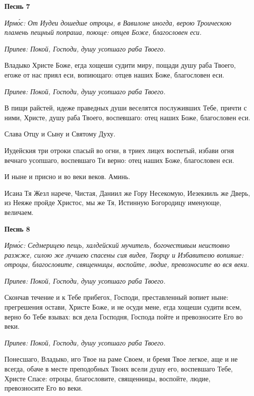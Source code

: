 \bfseries Песнь 7\normalfont{}


 \itshape Ирмо́с:\normalfont{} От Иудеи дошедше отроцы, в Вавилоне иногда, верою Троическою
пламень пещный попраша, поюще: отцев Боже, благословен еси.


 \itshape Припев:\normalfont{} Покой, Господи, душу усопшаго раба Твоего.


   Владыко Христе Боже, егда хощеши судити миру, пощади душу раба
Твоего, егоже от нас приял еси, вопиющаго: отцев наших Боже, благословен
еси.


 \itshape Припев:\normalfont{} Покой, Господи, душу усопшаго раба Твоего.



   В пищи райстей, идеже праведных души веселятся послуживших Тебе,
причти с ними, Христе, душу раба Твоего, воспевшаго: отец наших Боже,
благословен еси.


   Слава Отцу и Сыну и Святому Духу.


   Иудейския три отроки спасый во огни, в триех лицех воспетый, избави
огня вечнаго усопшаго, воспевшаго Ти верно: отец наших Боже, благословен
еси.


   И ныне и присно и во веки веков. Аминь.


   Исаиа Тя Жезл нарече, Чистая, Даниил же Гору Несекомую, Иезекииль
же Дверь, из Неяже пройде Христос, мы же Тя, Истинную Богородицу
именующе, величаем.



 

\bfseries Песнь 8\normalfont{}


 \itshape Ирмо́с:\normalfont{} Седмерицею пещь, халдейский мучитель, богочестивым неистовно
разжже, силою же лучшею спасены сия видев, Творцу и Избавителю вопияше:
отроцы, благословите, священницы, воспойте, людие, превозносите во вся
веки.


 \itshape Припев:\normalfont{} Покой, Господи, душу усопшаго раба Твоего.


   Скончав течение и к Тебе прибегох, Господи, преставленный вопиет ныне:
прегрешения остави, Христе Боже, и не осуди мене, егда хощеши судити
всем, верно бо Тебе взывах: вся дела Господня, Господа пойте и превозносите
Его во веки.


 \itshape Припев:\normalfont{} Покой, Господи, душу усопшаго раба Твоего.


   Понесшаго, Владыко, иго Твое на раме Своем, и бремя Твое легкое, аще
и не всегда, обаче в месте преподобных Твоих всели душу его, воспевшаго
Тебе, Христе Спасе: отроцы, благословите, священницы, воспойте, людие,
превозносите Его во веки.


